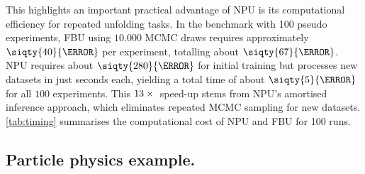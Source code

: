 
This highlights an important practical advantage of NPU is its computational efficiency for repeated unfolding tasks.
%
In the benchmark with 100 pseudo experiments, FBU using \(\num{10,000}\) MCMC draws requires approximately \(\siqty{40}{\s}\) per experiment, totalling about \(\siqty{67}{\minute}\).
%
NPU requires about \(\siqty{280}{\s}\) for initial training but processes new datasets in just seconds each, yielding a total time of about \(\siqty{5}{\minute}\) for all \(\num{100}\) experiments.
%
This \(\numproduct{13x\,}\) speed-up stems from NPU's amortised inference approach, which eliminates repeated MCMC sampling for new datasets.
%
\cref{tab:timing} summarises the computational cost of NPU and FBU for 100 runs.

\subsection{Particle physics example.}

